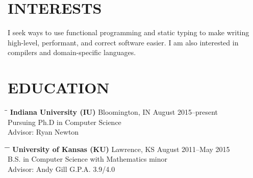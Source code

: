 \documentclass{res}
\begin{document}

\address{\texttt{rgscott@indiana.edu} $\bullet$ \texttt{ryanglscott.github.io}}

\begin{resume}

\section{INTERESTS}
    I seek ways to use functional programming and static typing to make writing high-level, performant, and correct software easier. I am also interested in compilers and domain-specific languages.

\section{EDUCATION}
	\vspace{-0.1in}
    \begin{tabbing}
    \hspace{2.3in}\= \hspace{2.55in}\= \kill %
     \textbf{Indiana University (IU)} \> Bloomington, IN \> August 2015--present \\
    Pursuing Ph.D in Computer Science \\
    Advisor: Ryan Newton \\
    \end{tabbing}
    \vspace{-0.5in}
    \begin{tabbing}
    \hspace{2.3in}\= \hspace{2.55in}\= \kill %
    \hspace{2.3in}\= \hspace{2.4in}\= \kill %
     \textbf{University of Kansas (KU)} \> Lawrence, KS \> August 2011--May 2015 \\
    B.S. in Computer Science with Mathematics minor \\
    Advisor: Andy Gill \> G.P.A. 3.9/4.0
    \end{tabbing}



\end{resume}
\end{document}
